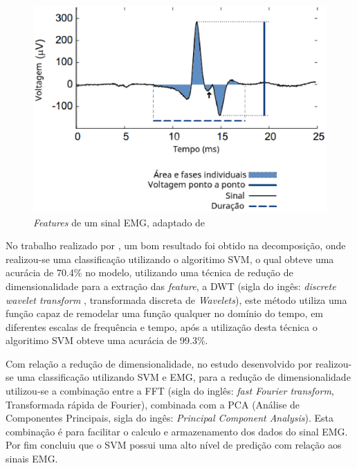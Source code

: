 \begin{figure}[!htb]
    \centering
     \includegraphics[width=1\textwidth]{figuras/featuresEMG.eps}
     \caption{\textit{Features} de um sinal EMG, adaptado de }
     \label{featuresEMG}
 \end{figure}
 
No trabalho realizado por , um bom resultado foi obtido na decomposição, onde realizou-se uma classificação utilizando o algoritimo SVM, o qual obteve uma acurácia de 70.4\% no modelo, utilizando uma técnica de redução de dimensionalidade para a extração das \textit{feature}, a DWT (sigla do ingês: \textit{discrete wavelet transform }, transformada discreta de \textit{Wavelets}), este método utiliza uma função capaz de remodelar uma função qualquer no domínio do tempo, em diferentes escalas de frequência e tempo, após a utilização desta técnica o algoritimo SVM obteve uma acurácia de 99.3\%.

Com relação a redução de dimensionalidade, no estudo desenvolvido por  realizou-se uma classificação utilizando SVM e EMG, para a redução de dimensionalidade utilizou-se a combinação entre a FFT (sigla do inglês: \textit{fast Fourier transform}, Transformada rápida de Fourier), combinada com a PCA (Análise de Componentes Principais, sigla do ingês: \textit{Principal Component Analysis}). Esta combinação é para facilitar o calculo e armazenamento dos dados do sinal EMG. Por fim  concluiu que o SVM possui uma alto nível de predição com relação aos sinais EMG.

